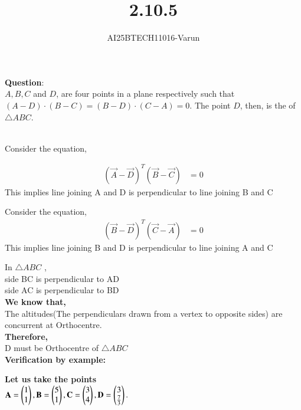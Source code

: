 \documentclass[journal]{IEEEtran}
\begin{document}

\vspace{3cm}

\title{2.10.5}
\author{AI25BTECH11016-Varun}
 \maketitle
{\let\newpage\relax\maketitle}
\renewcommand{\thefigure}{\theenumi}
\renewcommand{\thetable}{\theenumi}
\setlength{\intextsep}{10pt} %

\renewcommand{\thetable}{\theenumi}
\textbf{Question}:\\

$A, B, C$ and $D$, are four points in a plane respectively such that 
$(A - D) \cdot (B - C) = (B - D) \cdot (C - A) = 0.$  
The point $D$, then, is the \underline{\hspace{1cm}} of $\triangle ABC$. 

  
\solution \\
Consider the equation,

\begin{align}
(\vec{A}- \vec{D} )^{T} (\vec{B}- \vec{C})
&=0
\end{align}
This implies line joining A and D is perpendicular to line joining B and C


Consider the equation,
\begin{align}
(\vec{B}- \vec{D})^{T}(\vec{C}- \vec{A})
&=0
\end{align}
This implies line joining B and D is perpendicular to line joining A and C

In $\triangle ABC$ ,\\
  side BC is perpendicular to AD\\
side AC is perpendicular to BD\\
\textbf{We know that,}\\
The altitudes(The perpendiculars drawn from a vertex to opposite sides) are concurrent at Orthocentre.\\
\textbf{Therefore,}\\
D must be Orthocentre of $\triangle ABC$\\
\textbf{Verification by example:}


\textbf{Let us take the points}\\
$\mathbf{A}=\begin{pmatrix}1\\1\end{pmatrix},
\mathbf{B}=\begin{pmatrix}5\\1\end{pmatrix}, 
\mathbf{C}=\begin{pmatrix}3\\4\end{pmatrix}, 
\mathbf{D}=\begin{pmatrix}3\\\tfrac{7}{3}\end{pmatrix}.$
\end{document}
